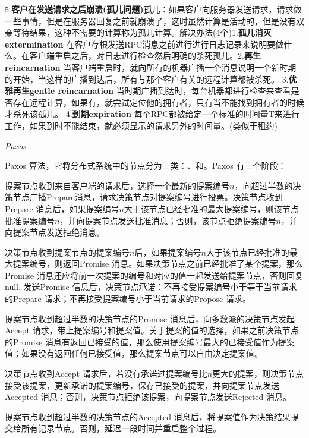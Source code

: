 \documentclass[twoside]{ctexart}
\begin{document}
\begin{multicols}{2}
  5.\textbf{客户在发送请求之后崩溃(孤儿问题)}孤儿：如果客户向服务器发送请求，请求做一些事情，但是在服务器回复之前就崩溃了，这时虽然计算是活动的，但是没有双亲等待结果，这种不需要的计算称为孤儿计算。解决办法(4个)1.\textbf{孤儿消灭extermination} 在客户存根发送RPC消息之前进行进行日志记录来说明要做什么。在客户端重启之后，对日志进行检查然后明确的杀死孤儿。2.\textbf{再生reincarnation} 当客户端重启时，就向所有的机器广播一个消息说明一个新时期的开始，当这样的广播到达后，所有与那个客户有关的远程计算都被杀死。  3.\textbf{优雅再生gentle reincarnation} 当时期广播到达时，每台机器都进行检查来查看是否存在远程计算，如果有，就尝试定位他的拥有者，只有当不能找到拥有者的时候才杀死该孤儿。  4.\textbf{到期expiration} 每个RPC都被给定一个标准的时间量T来进行工作，如果到时不能结束，就必须显示的请求另外的时间量。(类似于租约)

  \emph{Paxos}
  
  Paxos 算法，它将分布式系统中的节点分为三类：、和。Paxos 有三个阶段：
  
   提案节点收到来自客户端的请求后，选择一个最新的提案编号$n$，向超过半数的决策节点广播Prepare消息，请求决策节点对提案编号进行投票。决策节点收到Prepare 消息后，如果提案编号$n$大于该节点已经批准的最大提案编号，则该节点批准提案编号$n$，并向提案节点发送批准消息；否则，该节点拒绝提案编号$n$，并向提案节点发送拒绝消息。
  
   决策节点收到提案节点的提案编号$n$后，如果提案编号$n$大于该节点已经批准的最大提案编号，则返回Promise 消息。如果决策节点之前已经批准了某个提案，那么Promise 消息还应将前一次提案的编号和对应的值一起发送给提案节点，否则回复null. 发送Promise 信息后，决策节点承诺：不再接受提案编号小于等于当前请求的Prepare 请求；不再接受提案编号小于当前请求的Propose 请求。
  
   提案节点收到超过半数的决策节点的Promise 消息后，向多数派的决策节点发起Accept 请求，带上提案编号和提案值。关于提案的值的选择，如果之前决策节点的Promise 消息有返回已接受的值，那么使用提案编号最大的已接受值作为提案值；如果没有返回任何已接受值，那么提案节点可以自由决定提案值。
  
   决策节点收到Accept 请求后，若没有承诺过提案编号比$n$更大的提案，则决策节点接受该提案，更新承诺的提案编号，保存已接受的提案，并向提案节点发送Accepted 消息；否则，决策节点拒绝该提案，向提案节点发送Rejected 消息。
  
   提案节点收到超过半数的决策节点的Accepted 消息后，将提案值作为决策结果提交给所有记录节点。否则，延迟一段时间并重启整个过程。
  

\end{multicols}
\end{document}
